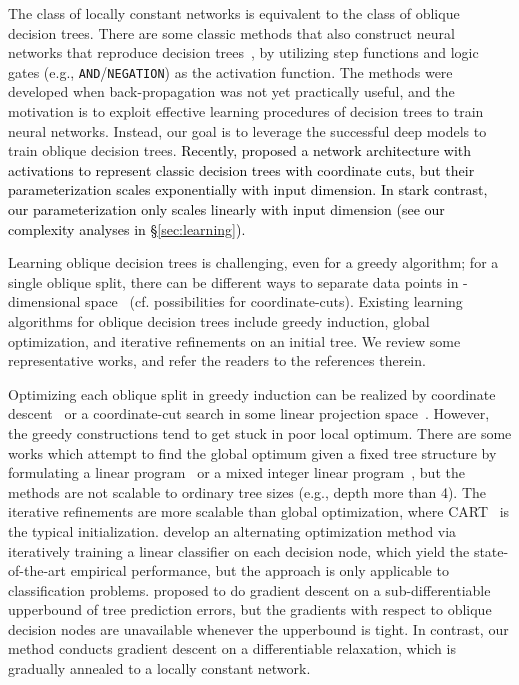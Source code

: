 \documentclass{article} \usepackage{iclr2020_conference,times}
\newcommand{\camera}[1]{\textcolor{black}{#1}}
\newcommand{\xref}[1]{\S\ref{#1}}
\begin{document}
The {class} of locally constant networks is equivalent to the class of oblique decision trees. 
There are some classic methods that also construct neural networks that reproduce decision trees~\citep{sethi1990entropy, brent1991fast, cios1992machine}, by utilizing step functions and logic gates (e.g., \texttt{AND}/\texttt{NEGATION}) as the activation function. The methods were developed when back-propagation was not yet practically useful, and the motivation is to exploit effective learning procedures of decision trees to train neural networks. Instead, our goal is to leverage the successful deep models to train oblique decision trees. 
\camera{Recently, \cite{yang2018deep} proposed a network architecture with  activations to represent classic decision trees with coordinate cuts, but their parameterization scales exponentially with input dimension. In stark contrast, our parameterization only scales linearly with input dimension (see our complexity analyses in \xref{sec:learning}).}

Learning oblique decision trees is challenging, even for a greedy algorithm; for a single oblique split, there can be  different ways to separate  data points in -dimensional space~\citep{vapnik1971growth} (cf.  possibilities for coordinate-cuts). Existing learning algorithms for oblique decision trees include greedy induction, global optimization, and iterative refinements on an initial tree. We review some representative works, and refer the readers to the references therein.

Optimizing each oblique split in greedy induction can be realized by coordinate descent~\citep{murthy1994system} or a coordinate-cut search in some linear projection space~\citep{menze2011oblique, wickramarachchi2016hhcart}. However, the greedy constructions tend to get stuck in poor local optimum. There are some works which attempt to find the global optimum given a fixed tree structure by formulating a linear program~\citep{bennett1994global} or a mixed integer linear program~\citep{bertsimas2017optimal}, but the methods are not scalable to ordinary tree sizes (e.g., depth more than 4). The iterative refinements are more scalable than global optimization, where CART~\citep{cart84} is the typical initialization. \citet{carreira2018alternating} develop an alternating optimization method via iteratively training a linear classifier on each decision node, which yield the state-of-the-art empirical performance, but the approach is only applicable to classification problems. 
\citet{norouzi2015efficient} proposed to do gradient descent on a sub-differentiable upperbound of tree prediction errors, but the gradients with respect to oblique decision nodes are unavailable whenever the upperbound is tight. In contrast, our method conducts gradient descent on a differentiable relaxation, which is gradually annealed to a locally constant network.
\end{document}
